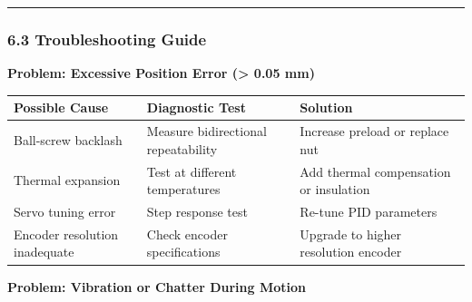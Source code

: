 \documentclass[
]{article}
\begin{document}
\begin{center}\rule{0.5\linewidth}{0.5pt}\end{center}

\subsubsection{6.3 Troubleshooting Guide}\label{troubleshooting-guide}

\textbf{Problem: Excessive Position Error (\textgreater{} 0.05 mm)}

{\def\LTcaptype{} %
\begin{longtable}[]{@{}
  >{\raggedright\arraybackslash}p{}
  >{\raggedright\arraybackslash}p{}
  >{\raggedright\arraybackslash}p{}@{}}
\toprule\noalign{}
\begin{minipage}[b]{\linewidth}\raggedright
Possible Cause
\end{minipage} & \begin{minipage}[b]{\linewidth}\raggedright
Diagnostic Test
\end{minipage} & \begin{minipage}[b]{\linewidth}\raggedright
Solution
\end{minipage} \\
\midrule\noalign{}
\endhead
\bottomrule\noalign{}
\endlastfoot
Ball-screw backlash & Measure bidirectional repeatability & Increase
preload or replace nut \\
Thermal expansion & Test at different temperatures & Add thermal
compensation or insulation \\
Servo tuning error & Step response test & Re-tune PID parameters \\
Encoder resolution inadequate & Check encoder specifications & Upgrade
to higher resolution encoder \\
\end{longtable}
}

\textbf{Problem: Vibration or Chatter During Motion}
\end{document}

